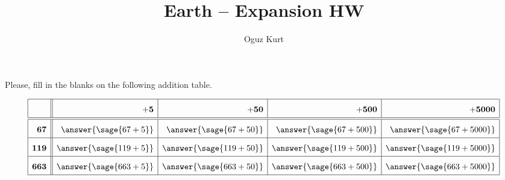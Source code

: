 \documentclass{ximera}
\title{Earth -- Expansion HW \hfill \makebox[0.5\textwidth]{Name:\enspace\hrulefill}}
\author{Oguz Kurt}
\begin{document}
\begin{abstract}
\empty
\end{abstract}
\begin{problem}
Please, fill in the blanks on the following addition table.
\begin{center}
$$
\arraycolsep=5pt\def\arraystretch{1.8}
\begin{array}[s]{|r||r|r|r|r|}
\hline
&~~~~~~~ \mathbf{+5} &~~~~~ \mathbf{+50} &~~~~ \mathbf{+500} &~~~ \mathbf{+5000} 
\\ 
\hline
\hline
\mathbf{67} &\answer{\sage{67+5}}&\answer{\sage{67+50}}&\answer{\sage{67+500}}&\answer{\sage{67+5000}} 
\\
\hline
\mathbf{119} &\answer{\sage{119+5}}&\answer{\sage{119+50}}&\answer{\sage{119+500}}&\answer{\sage{119+5000}} 
\\
\hline
\mathbf{663} &\answer{\sage{663+5}}&\answer{\sage{663+50}}&\answer{\sage{663+500}}&\answer{\sage{663+5000}} 
\\
\hline
\end{array}
$$
\end{center}
\end{problem}
\end{document}
